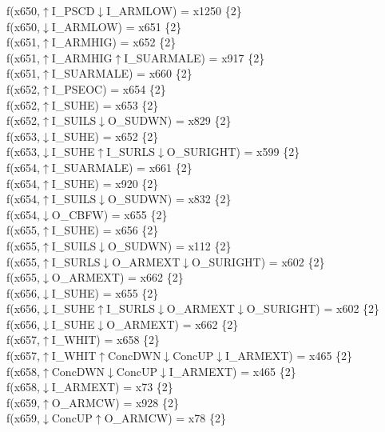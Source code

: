 f(x650,$\uparrow$I\_PSCD$\downarrow$I\_ARMLOW) = x1250 \{2\} \\  
f(x650,$\downarrow$I\_ARMLOW) = x651 \{2\} \\  
f(x651,$\uparrow$I\_ARMHIG) = x652 \{2\} \\  
f(x651,$\uparrow$I\_ARMHIG$\uparrow$I\_SUARMALE) = x917 \{2\} \\  
f(x651,$\uparrow$I\_SUARMALE) = x660 \{2\} \\  
f(x652,$\uparrow$I\_PSEOC) = x654 \{2\} \\  
f(x652,$\uparrow$I\_SUHE) = x653 \{2\} \\  
f(x652,$\uparrow$I\_SUILS$\downarrow$O\_SUDWN) = x829 \{2\} \\  
f(x653,$\downarrow$I\_SUHE) = x652 \{2\} \\  
f(x653,$\downarrow$I\_SUHE$\uparrow$I\_SURLS$\downarrow$O\_SURIGHT) = x599 \{2\} \\  
f(x654,$\uparrow$I\_SUARMALE) = x661 \{2\} \\  
f(x654,$\uparrow$I\_SUHE) = x920 \{2\} \\  
f(x654,$\uparrow$I\_SUILS$\downarrow$O\_SUDWN) = x832 \{2\} \\  
f(x654,$\downarrow$O\_CBFW) = x655 \{2\} \\  
f(x655,$\uparrow$I\_SUHE) = x656 \{2\} \\  
f(x655,$\uparrow$I\_SUILS$\downarrow$O\_SUDWN) = x112 \{2\} \\  
f(x655,$\uparrow$I\_SURLS$\downarrow$O\_ARMEXT$\downarrow$O\_SURIGHT) = x602 \{2\} \\  
f(x655,$\downarrow$O\_ARMEXT) = x662 \{2\} \\  
f(x656,$\downarrow$I\_SUHE) = x655 \{2\} \\  
f(x656,$\downarrow$I\_SUHE$\uparrow$I\_SURLS$\downarrow$O\_ARMEXT$\downarrow$O\_SURIGHT) = x602 \{2\} \\  
f(x656,$\downarrow$I\_SUHE$\downarrow$O\_ARMEXT) = x662 \{2\} \\  
f(x657,$\uparrow$I\_WHIT) = x658 \{2\} \\  
f(x657,$\uparrow$I\_WHIT$\uparrow$ConcDWN$\downarrow$ConcUP$\downarrow$I\_ARMEXT) = x465 \{2\} \\  
f(x658,$\uparrow$ConcDWN$\downarrow$ConcUP$\downarrow$I\_ARMEXT) = x465 \{2\} \\  
f(x658,$\downarrow$I\_ARMEXT) = x73 \{2\} \\  
f(x659,$\uparrow$O\_ARMCW) = x928 \{2\} \\  
f(x659,$\downarrow$ConcUP$\uparrow$O\_ARMCW) = x78 \{2\} \\  
